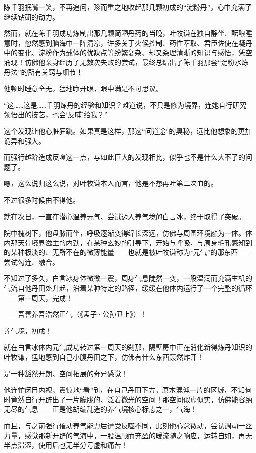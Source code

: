 陈千羽抿嘴一笑，不再追问，珍而重之地收起那几颗初成的“淀粉丹”，心中充满了继续钻研的动力。

然而，就在陈千羽成功炼制出那几颗简陋丹药的当晚，叶牧谦在独自静坐、酝酿睡意时，忽然感到脑海中一阵清凉，许多关于火候控制、药性萃取、君臣佐使在凝丹中的变化、淀粉作为载体的优缺点等纷繁复杂、却又条理清晰的知识与感悟，凭空涌现！仿佛他亲身经历了无数次失败的尝试，最终总结出了陈千羽那套“淀粉水炼丹法”的所有关窍与细节！

他顿时睡意全无。猛地睁开眼，眼中满是不可思议。

“这……这是……千羽炼丹的经验和知识？难道说，不只是修为境界，连她自行研究领悟出的技艺，也会‘反哺’给我？”

这个发现让他心脏狂跳。如果真是这样，那这“问道途”的奥秘，远比他想象的更加诡异和强大。

而强行越阶造成反噬这一点，与如此巨大的发现相比，似乎也不是什么大不了的问题了。

嗯，这么说归这么说，对叶牧谦本人而言，他是不想再吐第二次血的。

不过很多时候由不得他。

\vspace{2em}

就在次日，一直在潜心温养元气、尝试迈入养气境的白言冰，终于取得了突破。

院中槐树下，他盘膝而坐，呼吸逐渐变得绵长深远，仿佛与周围环境融为一体。体内那天骨境界滋生的内劲，在某种玄妙的引导下，开始与呼吸、与周身毛孔感知到的某种极淡的、无所不在的微薄能量——也就是被叶牧谦称为“元气”的那东西——尝试勾连、融合。

不知过了多久，白言冰身体微微一震，周身气息陡然一变，一股温润而充满生机的气流自他丹田处升起，沿着某种特定的路径，缓缓在他体内运行了一个完整的循环——第一周天，完成！

——吾善养吾浩然正气（《孟子·公孙丑上》）！

养气境，初成！

就在白言冰体内元气成功转过第一周天的刹那，隔壁房中正在消化新得炼丹知识的叶牧谦，猛地感到自己小腹丹田之下，仿佛有什么东西轰然炸开！

是一种豁然开朗、空间拓展的奇异感觉！

他连忙闭目内视，震惊地“看”到，在自己丹田下方，原本混沌一片的区域，不知何时竟然自行开辟出了一片朦胧的、泛着微光的空间！那空间似虚似实，仿佛能容纳无尽的气息——正是他胡编乱造的养气境核心标志之一，气海！

而且，与之前强行催动养气能力后遭受反噬不同，此刻他心念微动，尝试调动一丝力量，感觉那新开辟的气海中，一股温顺而充盈的暖流随之响应，运转自如，再无半点滞涩，使用后也无半分亏虚和痛苦！

